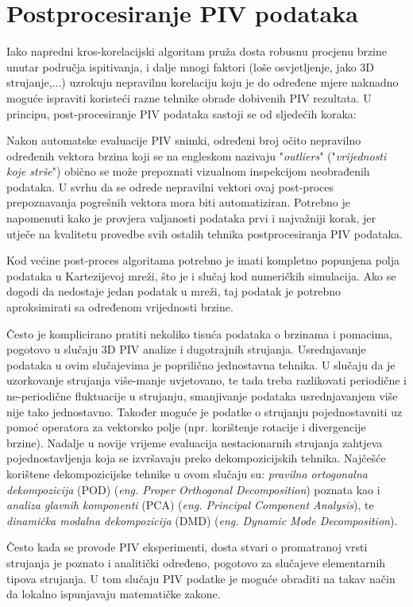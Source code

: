 \section{Postprocesiranje PIV podataka}
Iako napredni kros-korelacijski algoritam pruža dosta robusnu procjenu brzine unutar područja ispitivanja, i dalje mnogi faktori (loše osvjetljenje, jako 3D strujanje,...) uzrokuju nepravilnu korelaciju koju je do određene mjere naknadno moguće ispraviti koristeći razne tehnike obrade dobivenih PIV rezultata. U principu, post-procesiranje PIV podataka sastoji se od sljedećih koraka:
\begin{description}[style=unboxed,leftmargin=0cm]
	\item[Provjera valjanosti neobrađenih (\textit{eng. raw}) podataka.] Nakon automatske evaluacije PIV snimki, određeni broj očito nepravilno određenih vektora brzina koji se na engleskom nazivaju "\textit{outliers}" ("\textit{vrijednosti koje strše}") obično se može prepoznati vizualnom inspekcijom neobrađenih podataka. U svrhu da se odrede nepravilni vektori ovaj post-proces prepoznavanja pogrešnih vektora mora biti automatiziran. Potrebno je napomenuti kako je provjera valjanosti podataka prvi i najvažniji korak, jer utječe na kvalitetu provedbe svih ostalih tehnika postprocesiranja PIV podataka.
	\item[Zamjena pogrešnih podataka.] Kod većine post-proces algoritama potrebno je imati kompletno popunjena polja podataka u Kartezijevoj mreži, što je i slučaj kod numeričkih simulacija. Ako se dogodi da nedostaje jedan podatak u mreži, taj podatak je potrebno aproksimirati sa određenom vrijednosti brzine.
	\item[Smanjenje podataka.] Često je komplicirano pratiti nekoliko tisuća podataka o brzinama i pomacima, pogotovo u slučaju 3D PIV analize i dugotrajnih strujanja. Usrednjavanje podataka u ovim slučajevima je poprilično jednostavna tehnika. U slučaju da je uzorkovanje strujanja više-manje uvjetovano, te tada treba razlikovati periodične i ne-periodične fluktuacije u strujanju, smanjivanje podataka usrednjavanjem više nije tako jednostavno. Također moguće je podatke o strujanju pojednostavniti uz pomoć operatora za vektorsko polje (npr. korištenje rotacije i divergencije brzine). Nadalje u novije vrijeme evaluacija nestacionarnih strujanja zahtjeva pojednostavljenja koja se izvršavaju preko dekompozicijskih tehnika. Najčešće korištene dekompozicijske tehnike u ovom slučaju su: \textit{pravilna ortogonalna dekompozicija} (POD) (\textit{eng. Proper Orthogonal Decomposition}) poznata kao i \textit{analiza glavnih komponenti} (PCA) (\textit{eng. Principal Component Analysis}), te \textit{dinamička modalna dekompozicija} (DMD) (\textit{eng. Dynamic Mode Decomposition}).
	\item[Asimilacija podataka] Često kada se provode PIV eksperimenti, dosta stvari o promatranoj vrsti strujanja je poznato i analitički određeno, pogotovo za slučajeve elementarnih tipova strujanja. U tom slučaju PIV podatke je moguće obraditi na takav način da lokalno ispunjavaju matematičke zakone.
\end{description}
